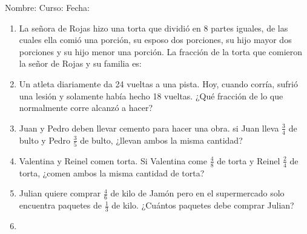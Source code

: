 \documentclass[letterpaper,fleqn]{article}
\newcommand{\LineaNombre}{%
\par
\vspace{\baselineskip}
Nombre:\hrulefill \; Curso: \underline{\hspace*{48pt}} \; Fecha: \underline{\hspace*{2.5cm}} \relax
\par}
\begin{document}
\LineaNombre
\begin{enumerate}
 \item La señora de Rojas hizo una torta que dividió en 8 partes iguales, de las cuales ella comió una porción, su esposo dos porciones, su hijo mayor dos porciones y su hijo menor una porción. La fracción de la torta que comieron la señor de Rojas y su familia es: \noanswer
 \item Un atleta diariamente da 24 vueltas a una pista. Hoy, cuando corría, sufrió una lesión y solamente había hecho 18 vueltas. ¿Qué  fracción de lo que normalmente corre alcanzó a hacer? \noanswer
\item Juan y Pedro deben llevar cemento para hacer una obra. si Juan lleva $\frac{3}{4}$ de bulto y Pedro $\frac{3}{5}$ de bulto, ¿llevan ambos la misma cantidad?\noanswer
\item Valentina y Reinel comen torta. Si Valentina come $\frac{4}{8}$ de torta y Reinel $\frac{2}{4}$ de torta, ¿comen ambos la misma cantidad de torta?\noanswer
\item Julian quiere comprar $\frac{4}{6}$ de kilo de Jamón pero en el supermercado solo encuentra  paquetes de $\frac{1}{3}$ de kilo. ¿Cuántos paquetes debe comprar Julian?\noanswer
\item 
 \end{enumerate}
\end{document}
